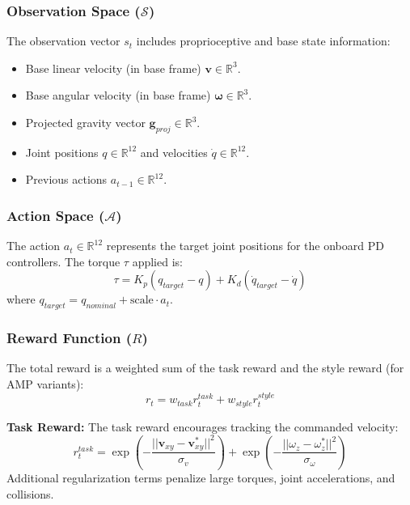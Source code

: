 \documentclass[conference]{IEEEtran}
\begin{document}
\subsubsection{Observation Space ($\mathcal{S}$)}
The observation vector $s_t$ includes proprioceptive and base state information:
\begin{itemize}
    \item Base linear velocity (in base frame) $\mathbf{v} \in \mathbb{R}^3$.
    \item Base angular velocity (in base frame) $\boldsymbol{\omega} \in \mathbb{R}^3$.
    \item Projected gravity vector $\mathbf{g}_{proj} \in \mathbb{R}^3$.
    \item Joint positions $q \in \mathbb{R}^{12}$ and velocities $\dot{q} \in \mathbb{R}^{12}$.
    \item Previous actions $a_{t-1} \in \mathbb{R}^{12}$.
\end{itemize}

\subsubsection{Action Space ($\mathcal{A}$)}
The action $a_t \in \mathbb{R}^{12}$ represents the target joint positions for the onboard PD controllers. The torque $\tau$ applied is:
\begin{equation}
    \tau = K_p (q_{target} - q) + K_d (\dot{q}_{target} - \dot{q})
\end{equation}
where $q_{target} = q_{nominal} + \text{scale} \cdot a_t$.

\subsubsection{Reward Function ($R$)}
The total reward is a weighted sum of the task reward and the style reward (for AMP variants):
\begin{equation}
    r_t = w_{task} r_t^{task} + w_{style} r_t^{style}
\end{equation}

\textbf{Task Reward:}
The task reward encourages tracking the commanded velocity:
\begin{equation}
    r_t^{task} = \exp(-\frac{||\mathbf{v}_{xy} - \mathbf{v}^*_{xy}||^2}{\sigma_v}) + \exp(-\frac{||\omega_z - \omega^*_z||^2}{\sigma_\omega})
\end{equation}
Additional regularization terms penalize large torques, joint accelerations, and collisions.
\end{document}
